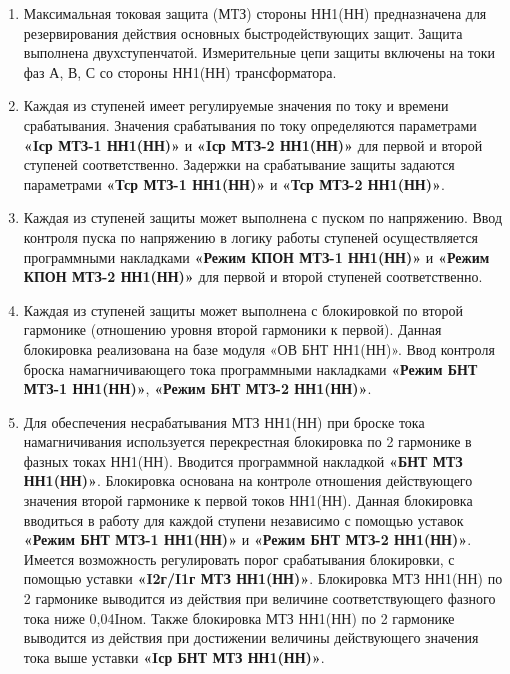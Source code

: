 \color{black}


\begin{enumerate}

\item
Максимальная токовая защита (МТЗ) стороны НН1(НН) предназначена для резервирования действия основных быстродействующих защит. Защита выполнена двухступенчатой. Измерительные цепи защиты включены на токи фаз А, В, С со стороны НН1(НН) трансформатора. 

\item
Каждая из ступеней имеет регулируемые значения по току и времени срабатывания. Значения срабатывания по току определяются параметрами \textbf{«Iср МТЗ-1 НН1(НН)»} и \textbf{«Iср МТЗ-2 НН1(НН)»} для
первой и второй ступеней соответственно. Задержки на срабатывание защиты задаются параметрами \textbf{«Тср МТЗ-1 НН1(НН)»} и \textbf{«Тср МТЗ-2 НН1(НН)»}.

\item
Каждая из ступеней защиты может выполнена с пуском по напряжению. Ввод контроля пуска по напряжению в логику работы ступеней осуществляется программными накладками \textbf{«Режим КПОН МТЗ-1 НН1(НН)»} и \textbf{«Режим КПОН МТЗ-2 НН1(НН)»} для первой и второй ступеней соответственно.

\item
Каждая из ступеней защиты может выполнена с блокировкой по второй гармонике (отношению уровня второй гармоники к первой). Данная блокировка реализована на базе модуля «ОВ БНТ НН1(НН)». Ввод контроля броска намагничивающего тока программными накладками \textbf{«Режим БНТ МТЗ-1 НН1(НН)»}, \textbf{«Режим БНТ МТЗ-2 НН1(НН)»}. 

\item
Для обеспечения несрабатывания МТЗ НН1(НН) при броске тока намагничивания используется перекрестная блокировка по 2 гармонике в фазных токах НН1(НН). Вводится программной накладкой \textbf{«БНТ МТЗ НН1(НН)»}.  Блокировка основана на контроле отношения действующего значения второй гармонике к первой токов НН1(НН). Данная блокировка вводиться в работу для каждой ступени независимо с помощью уставок \textbf{«Режим БНТ МТЗ-1 НН1(НН)»} и \textbf{«Режим БНТ МТЗ-2 НН1(НН)»}. Имеется возможность регулировать порог срабатывания блокировки, с помощью уставки \textbf{«I2г/I1г МТЗ НН1(НН)»}. Блокировка МТЗ НН1(НН) по 2 гармонике выводится из действия при величине соответствующего фазного тока ниже 0,04Iном. Также блокировка МТЗ НН1(НН) по 2 гармонике выводится из действия при достижении величины действующего значения тока выше уставки \textbf{«Iср БНТ МТЗ НН1(НН)»}.


\end{enumerate}
